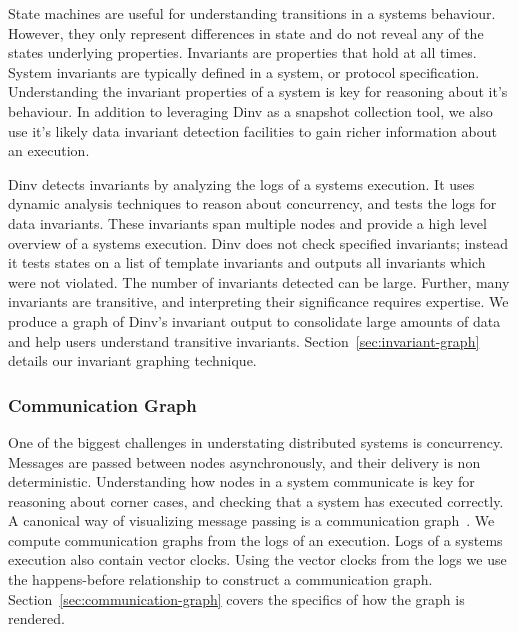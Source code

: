 State machines are useful for understanding transitions in a systems behaviour.
However, they only represent differences in state and do not reveal any of the
states underlying properties. Invariants are properties that hold at all times.
System invariants are typically defined in a system, or protocol specification.
Understanding the invariant properties of a system is key for reasoning about
it's behaviour. In addition to leveraging Dinv as a snapshot collection tool,
we also use it's likely data invariant detection facilities to gain richer information
about an execution.

Dinv detects invariants by analyzing the logs of a systems execution. It uses
dynamic analysis techniques to reason about concurrency, and tests the logs for
data invariants. These invariants span multiple nodes and provide a high level
overview of a systems execution. Dinv does not check specified invariants;
instead it tests states on a list of template  invariants and outputs all
invariants which were not violated. The number of invariants detected can be
large. Further, many invariants are transitive, and interpreting their
significance requires expertise. We produce a graph of Dinv's invariant output
to consolidate large amounts of data and help users understand transitive
invariants. Section~\ref{sec:invariant-graph} details our invariant
graphing technique.

\subsubsection{Communication Graph}

One of the biggest challenges in understating distributed systems is
concurrency. Messages are passed between nodes asynchronously, and
their delivery is non deterministic.  Understanding how nodes in a
system communicate is key for reasoning about corner cases, and
checking that a system has executed correctly. A canonical way of
visualizing message passing is a communication
graph~\cite{Lamport78,BeschastnikhWBE2016}. We compute communication
graphs from the logs of an execution. Logs of a systems execution also
contain vector clocks. Using the vector clocks from the logs we use
the happens-before relationship to construct a communication graph.
Section~\ref{sec:communication-graph} covers the specifics of how the
graph is rendered.
